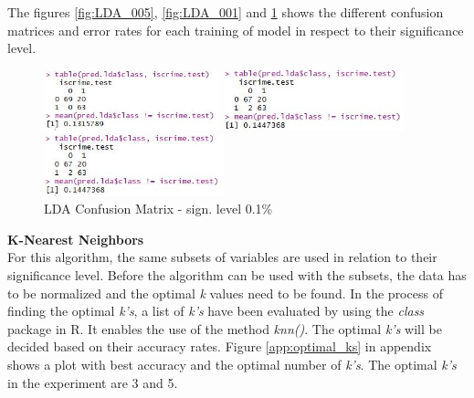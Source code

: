 The figures \ref{fig:LDA_005}, \ref{fig:LDA_001} and \ref{fig:LDA_0001} shows the different confusion matrices and error rates for each training of model in respect to their significance level. 

\begin{figure}[H]
\centering
\begin{minipage}{0.32\textwidth}
\centering
    \includegraphics[width=\linewidth, height=50pt]{Graphics/Assignment1/LDAConfusionsMatrix_005.JPG}
    \caption{LDA Confusion Matrix - sign. level 5\%}
    \label{fig:LDA_005}
\end{minipage}\hfill
\begin{minipage}{0.32\textwidth}
\centering

\includegraphics[width=\linewidth, height= 50pt]{Graphics/Assignment1/LDAConfusionsMatrix_001.JPG}
    \caption{LDA Confusion Matrix - sign. level 1\%}
    \label{fig:LDA_001}
\end{minipage}\hfill
\begin{minipage}{0.32\textwidth}
\centering

\includegraphics[width=\linewidth, height= 50pt]{Graphics/Assignment1/LDAConfusionsMatrix_0001.JPG}
    \caption{LDA Confusion Matrix - sign. level 0.1\%}
    \label{fig:LDA_0001}
\end{minipage}
\end{figure}



\noindent
\textbf{K-Nearest Neighbors}\\
For this algorithm, the same subsets of variables are used in relation to their significance level. Before the algorithm can be used with the subsets, the data has to be normalized and the optimal \textit{k} values need to be found. In the process of finding the optimal \textit{k's}, a list of \textit{k's} have been evaluated by using the \textit{class} package in R. It enables the use of the method \textit{knn()}. The optimal \textit{k's} will be decided based on their accuracy rates. Figure \ref{app:optimal_ks} in appendix shows a plot with best accuracy and the optimal number of \textit{k's}. The optimal \textit{k's} in the  experiment are 3 and 5. 

